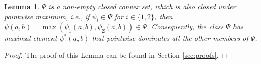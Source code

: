 \documentclass[conference,letterpaper,onecolumn]{IEEEtran}
\theoremstyle{plain}%
\newtheorem{lemma}[thm]{Lemma}
\begin{document}


\begin{lemma}\label{lemma2} $\Psi$ is a non-empty closed convex set, which is also closed under pointwise maximum, i.e., if $\psi_i\in\Psi$ for $i\in\{1,2\}$, then $\psi(a,b)=\max(\psi_1(a,b),\psi_2(a,b))\in\Psi$. Consequently, the class $\Psi$ has maximal element $\psi^*(a,b)$ that pointwise dominates all the other members of $\Psi$. %
\end{lemma}
\begin{proof}
    The proof of this Lemma can be found in Section \ref{sec:proofs}.
\end{proof}
\end{document}
